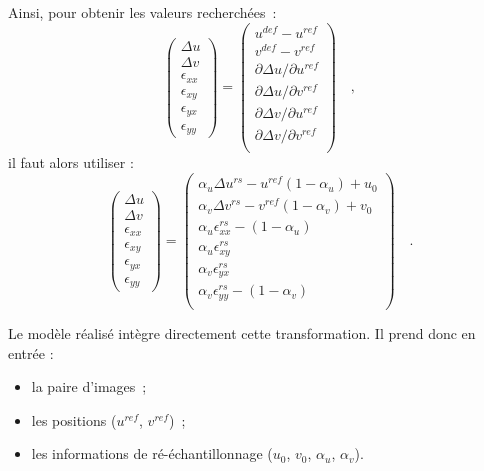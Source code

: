 \documentclass[
	a4paper, %
	10pt, %
	twoside, %
	french
]{LTJournalArticle}
\begin{document}
Ainsi, pour obtenir les valeurs recherchées~:
\begin{equation}
	\label{eq:disp_strain}
	\left(
		\begin{array}{c}
			\Delta u\\
			\Delta v\\
			\epsilon_{xx}\\
			\epsilon_{xy}\\
			\epsilon_{yx}\\
			\epsilon_{yy}
		\end{array}
	\right)
	=
	\left(
		\begin{array}{c}
			u^{def} - u^{ref}\\
			v^{def} - v^{ref}\\
			\partial \Delta u / \partial u^{ref}\\
			\partial \Delta u / \partial v^{ref}\\
			\partial \Delta v / \partial u^{ref}\\
			\partial \Delta v / \partial v^{ref}\\
		\end{array}
	\right) \quad ,
\end{equation}
il faut alors utiliser :
\begin{equation}
	\left(
		\begin{array}{c}
			\Delta u\\
			\Delta v\\
			\epsilon_{xx}\\
			\epsilon_{xy}\\
			\epsilon_{yx}\\
			\epsilon_{yy}
		\end{array}
	\right)
	=
	\left(
		\begin{array}{c}
			\alpha_u \Delta u^{rs} - u^{ref} (1 - \alpha_u) + u_0\\
			\alpha_v \Delta v^{rs} - v^{ref} (1 - \alpha_v) + v_0\\
			\alpha_u \epsilon_{xx}^{rs} - (1-\alpha_u)\\
			\alpha_u \epsilon_{xy}^{rs}\\
			\alpha_v \epsilon_{yx}^{rs}\\
			\alpha_v \epsilon_{yy}^{rs} - (1-\alpha_v)\\
		\end{array}
	\right) \quad .
\end{equation}

Le modèle réalisé intègre directement cette transformation.
Il prend donc en entrée :
\begin{itemize}
	\item la paire d'images~;
	\item les positions ($u^{ref}$, $v^{ref}$)~;
	\item les informations de ré-échantillonnage ($u_0$, $v_0$, $\alpha_u$, $\alpha_v$).
\end{itemize}
\end{document}
